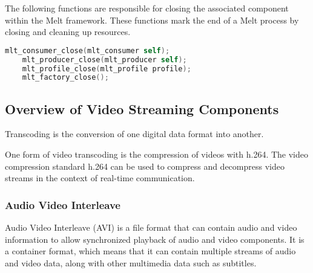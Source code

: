 \documentclass[../MasterThesis.tex]{subfiles}
\begin{document}
\begin{description}[font=\normalfont\color{RedViolet!80!black}, style=nextline]
	The following functions are responsible for closing the associated component within the Melt framework. These functions mark the end of a Melt process by closing and cleaning up resources.
	
	\begin{lstlisting}[language=C, numbers=none, basicstyle=\footnotesize\ttfamily, belowskip=0pt, aboveskip=9pt]
	mlt_consumer_close(mlt_consumer self); 
	mlt_producer_close(mlt_producer self); 
	mlt_profile_close(mlt_profile profile); 
	mlt_factory_close();
	\end{lstlisting}
	
	
\end{description}









\newpage

\subsection{Overview of Video Streaming Components}
\label{subsection_OverviewVideoStreamingComponents}


Transcoding is the conversion of one digital data format into another.~\cite{transcoding}

One form of video transcoding is the compression of videos with h.264.
The video compression standard h.264 can be used to compress and decompress video streams in the context of real-time communication.~\cite{transcoding}
	




\subsubsection*{Audio Video Interleave} 

Audio Video Interleave (AVI) is a file format that can contain audio and video information to allow synchronized playback of audio and video components. 
It is a container format, which means that it can contain multiple streams of audio and video data, along with other multimedia data such as subtitles.~\cite{avi}
\end{document}
